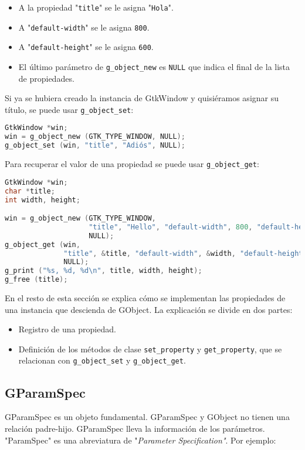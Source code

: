 \vspace{-\topsep}
\begin{itemize}
  \tightlist
\item A la propiedad "\texttt{title}" se le asigna "\texttt{Hola}".
\item A "\texttt{default-width}" se le asigna \texttt{800}.
\item A "\texttt{default-height}" se le asigna \texttt{600}.
\item El último parámetro de \texttt{g\_object\_new} es \texttt{NULL} que indica el
  final de la lista de propiedades.
\end{itemize}

Si ya se hubiera creado la instancia de \textsf{GtkWindow} y quisiéramos asignar su
título, se puede usar \texttt{g\_object\_set}:
\begin{lstlisting}[language=C]
GtkWindow *win;
win = g_object_new (GTK_TYPE_WINDOW, NULL);
g_object_set (win, "title", "Adiós", NULL);
\end{lstlisting}

Para recuperar el valor de una propiedad se puede usar \texttt{g\_object\_get}:

\begin{lstlisting}[language=C]
GtkWindow *win;
char *title;
int width, height;

win = g_object_new (GTK_TYPE_WINDOW,
                    "title", "Hello", "default-width", 800, "default-height", 600,
                    NULL);
g_object_get (win,
              "title", &title, "default-width", &width, "default-height", &height,
              NULL);
g_print ("%s, %d, %d\n", title, width, height);
g_free (title);
\end{lstlisting}

En el resto de esta sección se explica cómo se implementan las propiedades de una
instancia que descienda de \textsf{GObject}. La explicación se divide en dos partes:
\vspace{-\topsep}
\begin{itemize}
  \tightlist
\item Registro de una propiedad.
\item Definición de los métodos de clase \texttt{set\_property} y \texttt{get\_property},
  que se relacionan con \texttt{g\_object\_set} y \texttt{g\_object\_get}.
\end{itemize}

\subsection{\textsf{GParamSpec}}
\textsf{GParamSpec} es un objeto fundamental. \textsf{GParamSpec} y \textsf{GObject}
no tienen una relación padre-hijo. \textsf{GParamSpec} lleva la información de los
parámetros. \textsf{"ParamSpec"} es una abreviatura de "\emph{Parameter Specification"}.
Por ejemplo:

